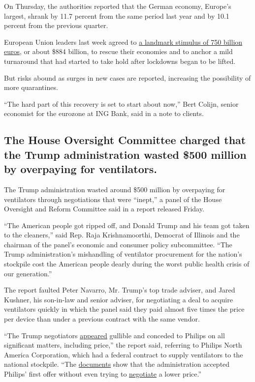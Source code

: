 On Thursday, the authorities reported that the German economy, Europe's
largest, shrank by 11.7 percent from the same period last year and by
10.1 percent from the previous quarter.

European Union leaders last week agreed to
\href{https://www.nytimes.com/2020/07/20/world/europe/eu-stimulus-coronavirus.html}{a
landmark stimulus of 750 billion euros}, or about \$884 billion, to
rescue their economies and to anchor a mild turnaround that had started
to take hold after lockdowns began to be lifted.

But risks abound as surges in new cases are reported, increasing the
possibility of more quarantines.

``The hard part of this recovery is set to start about now,'' Bert
Colijn, senior economist for the eurozone at ING Bank, said in a note to
clients.

\hypertarget{the-house-oversight-committee-charged-that-the-trump-administration-wasted-500-million-by-overpaying-for-ventilators}{%
\subsection{The House Oversight Committee charged that the Trump
administration wasted \$500 million by overpaying for
ventilators.}\label{the-house-oversight-committee-charged-that-the-trump-administration-wasted-500-million-by-overpaying-for-ventilators}}

The Trump administration wasted around \$500 million by overpaying for
ventilators through negotiations that were ``inept,'' a panel of the
House Oversight and Reform Committee said in a report released Friday.

``The American people got ripped off, and Donald Trump and his team got
taken to the cleaners,'' said Rep. Raja Krishnamoorthi, Democrat of
Illinois and the chairman of the panel's economic and consumer policy
subcommittee. ``The Trump administration's mishandling of ventilator
procurement for the nation's stockpile cost the American people dearly
during the worst public health crisis of our generation.''

The report faulted Peter Navarro, Mr. Trump's top trade adviser, and
Jared Kushner, his son-in-law and senior adviser, for negotiating a deal
to acquire ventilators quickly in which the panel said they paid almost
five times the price per device than under a previous contract with the
same vendor.

``The Trump negotiators
\href{https://oversight.house.gov/sites/democrats.oversight.house.gov/files/1122-1125_Redacted.pdf}{appeared}
gullible and conceded to Philips on all significant matters, including
price,'' the report said, referring to Philips North America
Corporation, which had a federal contract to supply ventilators to the
national stockpile. ``The
\href{https://oversight.house.gov/sites/democrats.oversight.house.gov/files/298-299_Redacted.pdf}{documents}
show that the administration accepted Philips' first offer without even
trying to
\href{https://oversight.house.gov/sites/democrats.oversight.house.gov/files/1251-1280_Redacted.pdf}{negotiate}
a lower price.''

